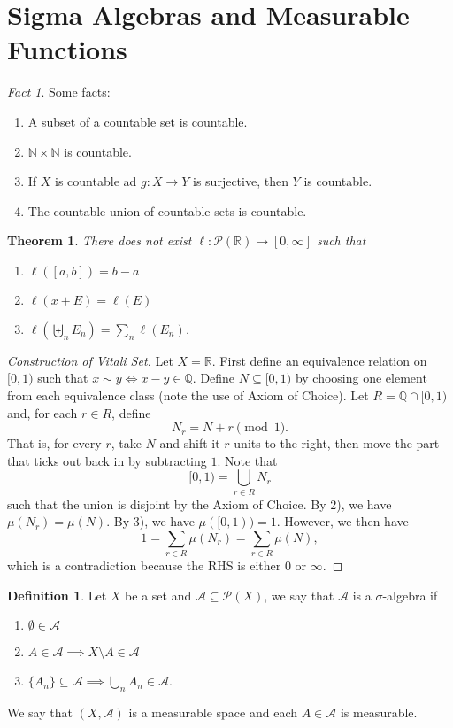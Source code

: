\documentclass[letterpaper,12pt]{article}
\theoremstyle{definition}
\newtheorem{definition}{Definition}[section]
\theoremstyle{plain}
\newtheorem{thm}{Theorem}[section]
\theoremstyle{remark}
\newtheorem*{fact}{Fact}
\newcommand{\R}{\mathbb{R}}
\newcommand{\N}{\mathbb{N}}
\begin{document}
\section{Sigma Algebras and Measurable Functions}

\begin{fact}
Some facts:
\begin{enumerate}
  \item A subset of a countable set is countable.
  \item $\N\times\N$ is countable.
  \item If $X$ is countable ad $g:X\to Y$ is surjective, then $Y$ is countable.
  \item The countable union of countable sets is countable.
\end{enumerate}
\end{fact}

\begin{thm}
There does not exist $\ell:\mathcal{P}(\R)\to [0,\infty]$ such that
\begin{enumerate}
  \item $\ell([a,b])=b-a$
  \item $\ell(x+E) = \ell(E)$
  \item $\ell \left(\biguplus_n E_n\right) = \sum_n \ell(E_n)$.
\end{enumerate}
\end{thm}

\begin{proof}[Construction of Vitali Set]
Let $X=\mathbb{R}$. First define an equivalence relation on $[0,1)$ such that $x\sim y \iff x-y\in\mathbb{Q}$. Define $N\subseteq [0,1)$ by choosing one element from each equivalence class (note the use of Axiom of Choice). Let $R = \mathbb{Q}\cap[0,1)$ and, for each $r\in R$, define
\[N_r = N+r \pmod{1}.\]
That is, for every $r$, take $N$ and shift it $r$ units to the right, then move the part that ticks out back in by subtracting $1$. Note that
\[[0,1) = \bigcup_{r\in R} N_r\]
such that the union is disjoint by the Axiom of Choice. By 2), we have $\mu(N_r) = \mu(N)$. By 3), we have $\mu([0,1)) = 1$. However, we then have
\[1 = \sum_{r\in R} \mu(N_r) = \sum_{r\in R} \mu(N),\]
which is a contradiction because the RHS is either $0$ or $\infty$.
\end{proof}

\begin{definition}
Let $X$ be a set and $\mathcal{A}\subseteq \mathcal{P}(X)$, we say that $\mathcal{A}$ is a $\sigma$-algebra if
\begin{enumerate}
  \item $\emptyset\in \mathcal{A}$
  \item $A\in \mathcal{A}\implies X\setminus A\in \mathcal{A}$
  \item $\{A_n\}\subseteq \mathcal{A}\implies \bigcup_nA_n\in \mathcal{A}$.
\end{enumerate}
We say that $(X,\mathcal{A})$ is a measurable space and each $A\in \mathcal{A}$ is measurable.
\end{definition}
\end{document}
